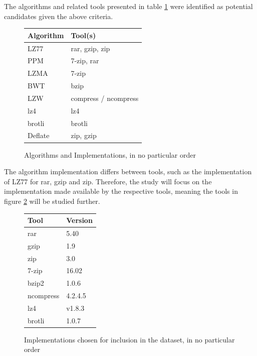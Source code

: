 \documentclass[conference]{IEEEtran}
\begin{document}
The algorithms and related tools presented in table \ref{fig:method:algorithms} were identified as potential candidates given the above criteria.

\begin{figure}[H]
    \centering
    \begin{tabular}{l|l}
        Algorithm & Tool(s)\\
        \hline
        LZ77 & rar, gzip, zip\cite{HORNEY2013,KONECKI2011} \\
        PPM & 7-zip, rar\cite{HORNEY2013, KONECKI2011} \\
        LZMA & 7-zip\cite{HORNEY2013, KONECKI2011} \\
        BWT & bzip\cite{HORNEY2013, KONECKI2011} \\
        LZW & compress / ncompress\cite{HORNEY2013, KONECKI2011} \\
        lz4 & lz4\footnotemark\\
        brotli & brotli\footnotemark \\
        Deflate & zip, gzip\cite{HORNEY2013} \\
    \end{tabular}
    \caption{Algorithms and Implementations, in no particular order}
    \label{fig:method:algorithms}
\end{figure}
\addtocounter{footnote}{-2}
\addtocounter{footnote}{1}
\addtocounter{footnote}{1}

The algorithm implementation differs between tools, such as the implementation of LZ77 for rar, gzip and zip\cite{HORNEY2013}. Therefore, the study will focus on the implementation made available by the respective tools, meaning the tools in figure \ref{fig:method:algorithms2} will be studied 
further.

\begin{figure}[H]
    \centering
    \begin{tabular}{l|l}
        Tool & Version\\
        \hline
        rar & 5.40 \\
        gzip & 1.9 \\
        zip & 3.0 \\
        7-zip & 16.02 \\
        bzip2 & 1.0.6 \\
        ncompress & 4.2.4.5 \\
        lz4 & v1.8.3 \\
        brotli & 1.0.7
    \end{tabular}
    \caption{Implementations chosen for inclusion in the dataset, in no particular order}
    \label{fig:method:algorithms2}
\end{figure}
\end{document}
